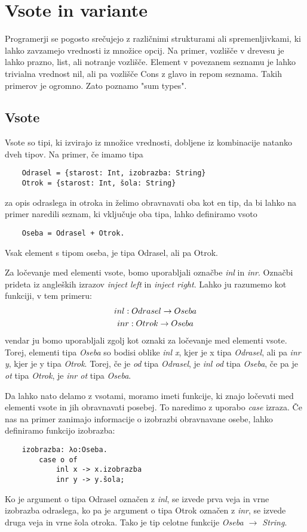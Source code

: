 \documentclass[12pt,a4paper,openany]{book}
\begin{document}
\chapter{Vsote in variante}
Programerji se pogosto srečujejo z različnimi strukturami ali spremenljivkami, ki lahko zavzamejo vrednosti iz množice opcij. Na primer, vozlišče v drevesu je lahko prazno, list, ali 
notranje vozlišče. Element v povezanem seznamu je lahko trivialna vrednost nil, ali pa vozlišče Cons z glavo in repom seznama. Takih primerov je ogromno. Zato poznamo "sum types".

\section{Vsote}
Vsote so tipi, ki izvirajo iz množice vrednosti, dobljene iz kombinacije natanko dveh tipov. Na primer, če imamo tipa
\begin{lstlisting}
    Odrasel = {starost: Int, izobrazba: String}
    Otrok = {starost: Int, šola: String}
\end{lstlisting}
za opis odraslega in otroka in želimo obravnavati oba kot en tip, da bi lahko na primer naredili seznam, ki vključuje oba tipa, lahko definiramo vsoto
\begin{lstlisting}
    Oseba = Odrasel + Otrok.
\end{lstlisting}
Vsak element s tipom oseba, je tipa Odrasel, ali pa Otrok.

Za ločevanje med elementi vsote, bomo uporabljali označbe \emph{inl} in \emph{inr}. Označbi prideta iz angleških izrazov \textit{inject left} in \textit{inject right}. Lahko ju razumemo kot
funkciji, v tem primeru:
\begin{gather}
    inl: Odrasel \rightarrow Oseba \notag\\
    inr: Otrok \rightarrow Oseba \notag
\end{gather}
vendar ju bomo uporabljali zgolj kot oznaki za ločevanje med elementi vsote. Torej, elementi tipa \emph{Oseba} so bodisi oblike \emph{inl x}, kjer je x tipa \emph{Odrasel}, ali pa \emph{inr y}, kjer je y 
tipa \emph{Otrok}. Torej, če je \emph{od} tipa \emph{Odrasel}, je \emph{inl od} tipa \emph{Oseba}, če pa je \emph{ot} tipa \emph{Otrok}, je \emph{inr ot} tipa \emph{Oseba}.

Da lahko nato delamo z vsotami, moramo imeti funkcije, ki znajo ločevati med elementi vsote in jih obravnavati posebej. To naredimo z uporabo \emph{case} izraza. Če nas na primer zanimajo 
informacije o izobrazbi obravnavane osebe, lahko definiramo funkcijo izobrazba:
\begin{lstlisting}
    izobrazba: λo:Oseba.
        case o of
            inl x -> x.izobrazba
            inr y -> y.šola;
\end{lstlisting}
Ko je argument o tipa Odrasel označen z \emph{inl}, se izvede prva veja in vrne izobrazba odraslega, ko pa je argument o tipa Otrok označen z \emph{inr}, se izvede druga veja in vrne šola
otroka. Tako je tip celotne funkcije \emph{Oseba $\rightarrow$ String}.
\end{document}
